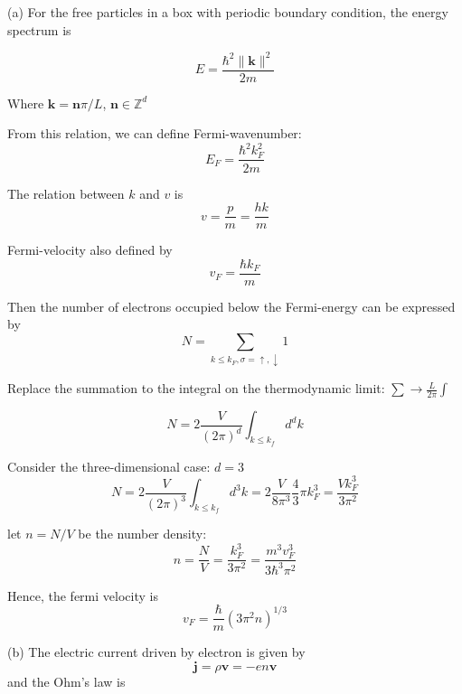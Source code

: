 \documentclass[a4paper,11pt]{article}
\begin{document}
(a)
For the free particles in a box with periodic boundary condition, the energy spectrum is

\begin{equation}
    E = \frac{\hbar^2 \|\mathbf k\|^2}{2m}
\end{equation}

Where $\mathbf k = \mathbf n\pi/L$, $\mathbf n\in\mathbb Z^d$

From this relation, we can define Fermi-wavenumber:
\begin{equation}
    E_F = \frac{\hbar^2k_F^2}{2m}
\end{equation}

The relation between $k$ and $v$ is
\begin{equation}
    v=\frac{p}{m}=\frac{hk}{m}
\end{equation}

Fermi-velocity also defined by
\begin{equation}
    v_F = \frac{\hbar k_F}{m}
\end{equation}

Then the number of electrons occupied below the Fermi-energy can be expressed by
\begin{equation}
    N = \sum_{k\leq k_F, \sigma=\uparrow, \downarrow} 1
\end{equation}

Replace the summation to the integral on the thermodynamic limit: $\sum\rightarrow \frac{L}{2\pi}\int$

\begin{equation}
    N = 2\frac{V}{(2\pi)^d}\int_{k\leq k_f} d^dk
\end{equation}

Consider the three-dimensional case: $d=3$
\begin{equation}
    N = 2\frac{V}{(2\pi)^3}\int_{k\leq k_f} d^3k = 2\frac{V}{8\pi^3}\frac{4}{3}\pi k_F^3 = \frac{Vk_F^3}{3\pi^2}
\end{equation}

let $n = N/V$ be the number density:
\begin{equation}
    n = \frac{N}{V} = \frac{k_F^3}{3\pi^2} = \frac{m^3v_F^3}{3\hbar^3\pi^2}
\end{equation}

Hence, the fermi velocity is
\begin{equation}
    v_F = \frac{\hbar}{m}(3\pi^2 n)^{1/3}
\end{equation}

(b)
The electric current driven by electron is given by
\begin{equation}
    \mathbf j=\rho\mathbf v = -en\mathbf v
\end{equation}
and the Ohm's law is
\end{document}

